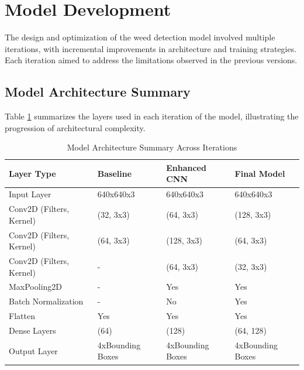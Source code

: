 \documentclass[conference]{IEEEtran}
\begin{document}
\section{Model Development}
The design and optimization of the weed detection model involved multiple iterations, with incremental improvements in architecture and training strategies. Each iteration aimed to address the limitations observed in the previous versions.

\subsection{Model Architecture Summary}
Table \ref{tab:model_architecture} summarizes the layers used in each iteration of the model, illustrating the progression of architectural complexity.

\begin{table}[H]
\centering
\caption{Model Architecture Summary Across Iterations}
\label{tab:model_architecture}
\begin{tabularx}{\columnwidth}{|l|X|X|X|}
\hline
\textbf{Layer Type}       & \textbf{Baseline} & \textbf{Enhanced CNN} & \textbf{Final Model} \\ \hline
Input Layer               & 640x640x3         & 640x640x3             & 640x640x3           \\ \hline
Conv2D (Filters, Kernel)  & (32, 3x3)         & (64, 3x3)             & (128, 3x3)          \\ \hline
Conv2D (Filters, Kernel)  & (64, 3x3)         & (128, 3x3)            & (64, 3x3)           \\ \hline
Conv2D (Filters, Kernel)  & -                 & (64, 3x3)             & (32, 3x3)           \\ \hline
MaxPooling2D              & -                 & Yes                   & Yes                 \\ \hline
Batch Normalization       & -                 & No                    & Yes                 \\ \hline
Flatten                   & Yes               & Yes                   & Yes                 \\ \hline
Dense Layers              & (64)              & (128)                 & (64, 128)           \\ \hline
Output Layer              & 4xBounding Boxes  & 4xBounding Boxes      & 4xBounding Boxes    \\ \hline
\end{tabularx}
\end{table}
\end{document}
